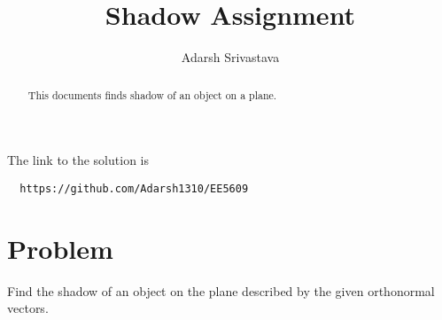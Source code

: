 \documentclass[journal,12pt,twocolumn]{IEEEtran}
\begin{document}
      \def\rightbox#1{\makebox[0in][r]{#1}}
      \def\centbox#1{\makebox[0in]{#1}}
      \def\topbox#1{\raisebox{-\baselineskip}[0in][0in]{#1}}
      \def\midbox#1{\raisebox{-0.5\baselineskip}[0in][0in]{#1}}
 \vspace{3cm}
 \title{Shadow Assignment}
 \author{Adarsh Srivastava}
 \maketitle
 \newpage
 \bigskip
 \renewcommand{\thetable}{\theenumi}
 The link to the solution is
 \begin{lstlisting}
  https://github.com/Adarsh1310/EE5609
 \end{lstlisting}
 \begin{abstract}
 This documents finds shadow of an object on a plane.
 \end{abstract}
  \section{\textbf{Problem}}
Find the shadow of an object on the plane described by the given orthonormal vectors.
\end{document}
